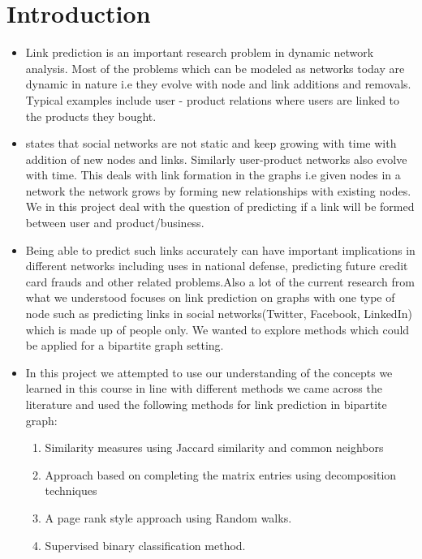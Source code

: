 \documentclass[letterpaper,twocolumn,11pt]{article}
\begin{document}
\section{Introduction}

\begin{itemize}
\item[] Link prediction is an important research problem in dynamic network analysis. Most of the problems which can be modeled as networks today are dynamic in nature i.e they evolve with node and link additions and removals. Typical examples include user - product relations where users are linked to the products they bought.


\item[] \cite{nine} states that social networks are not static and keep growing with time with addition of new nodes and links. Similarly user-product networks also evolve with time. This deals with link formation in the graphs i.e given nodes in a network the network grows by forming new relationships with existing nodes. We in this project deal with the question of predicting if a link will be formed between user and product/business.


\item[] Being able to predict such links accurately can have important implications in different networks including uses in national defense, predicting future credit card frauds and other related problems.Also a lot of the current research from what we understood focuses on link prediction on graphs with one type of node such as predicting links in social networks(Twitter, Facebook, LinkedIn) which is made up of people only. We wanted to explore methods which could be applied for a bipartite graph setting.


\item[] In this project we attempted to use our understanding of the concepts we learned in this course in line with different methods we came across the literature and used the following methods for link prediction in bipartite graph:
\begin{enumerate}
\item Similarity measures using Jaccard similarity and common neighbors
\item Approach based on completing the matrix entries using decomposition techniques
\item A page rank style approach using Random walks.
\item Supervised binary classification method.
\end{enumerate}
\end{itemize}
\end{document}
